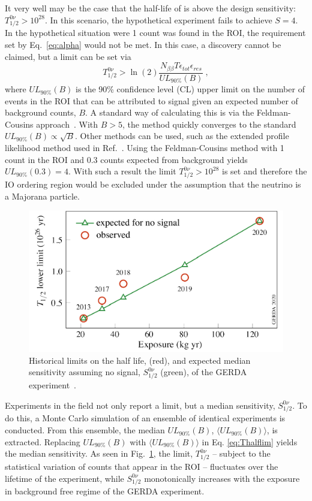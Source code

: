It very well may be the case that the half-life of \novbb{} is above the design sensitivity: $T^{0\nu}_{1/2} > 10^{28}$. In this scenario, the hypothetical experiment fails to achieve $S = 4$. In the hypothetical situation were 1 count was found in the ROI, the requirement set by Eq.~\ref{eq:alpha} would not be met. In this case, a discovery cannot be claimed, but a limit can be set via
\begin{equation}
T^{0\nu}_{1/2} > \ln(2)\frac{N_{\beta\beta}T\epsilon_{tot}\epsilon_{res}}{UL_{90\%}(B)}~, 
\label{eq:Thalflim}
\end{equation}
where $UL_{90\%}(B)$ is the 90\% confidence level (CL) upper limit on the number of events in the ROI that can be attributed to signal given an expected number of background counts, $B$. A standard way of calculating this is via the Feldman-Cousins approach~\cite{fc}. With $B>5$, the method quickly converges to the standard $UL_{90\%}(B) \propto \sqrt B$. Other methods can be used, such as the extended profile likelihood method used in Ref.~\cite{mjd_26}. Using the Feldman-Cousins method with 1 count in the ROI and 0.3 counts expected from background yields $UL_{90\%}(0.3) = 4$. With such a result the limit $T^{0\nu}_{1/2} > 10^{28}$ is set and therefore the IO ordering region would be excluded under the assumption that the neutrino is a Majorana particle.
\begin{figure}[htb]
	\centering
	\includegraphics{figs/0vbb/gerda_sensitivity.pdf}
	\caption{Historical limits on the \novbb{} half life, \Thalf{} (red), and expected median sensitivity assuming no signal, $S^{0\nu}_{1/2}$ (green), of the GERDA experiment~\cite{GERDA2020}.}
	\label{fig:sensitivity_gerda}
\end{figure}

Experiments in the field not only report a limit, but a median sensitivity, $S^{0\nu}_{1/2}$. To do this, a Monte Carlo simulation of an ensemble of identical experiments is conducted. From this ensemble, the median $UL_{90\%}(B)$,  $\langle UL_{90\%}(B) \rangle$, is extracted. Replacing $UL_{90\%}(B)$ with $\langle UL_{90\%}(B) \rangle$ in Eq. \ref{eq:Thalflim} yields the median sensitivity. As seen in Fig.~\ref{fig:sensitivity_gerda}, the limit, $T^{0\nu}_{1/2}$ -- subject to the statistical variation of counts that appear in the ROI -- fluctuates over the lifetime of the experiment, while $S^{0\nu}_{1/2}$ monotonically increases with the exposure in background free regime of the GERDA experiment.

